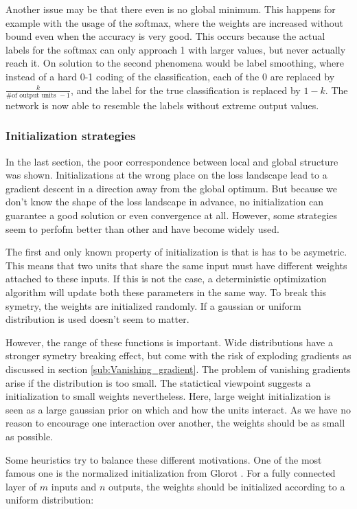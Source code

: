 Another issue may be that there even is no global minimum. This happens for
example with the usage of the softmax, where the weights are increased without
bound even when the accuracy is very good. This occurs because the actual labels
for the softmax can only approach 1 with larger values, but never actually reach
it.  On solution to the second phenomena would be label smoothing, where instead
of a hard 0-1 coding of the classification, each of the 0 are replaced by
$\frac{k}{\textrm{\# of output units }-1}$, and the label for the true
classification is replaced by $1-k$. The network is now able to
resemble the labels without extreme output values.


\subsubsection{Initialization strategies}\label{sub:Initialization_strategies}
In the last section, the poor correspondence between local and global structure
was shown. Initializations at the wrong place on the loss landscape lead to a
gradient descent in a direction away from the global optimum. But because we
don't know the shape of the loss landscape in advance, no initialization can
guarantee a good solution or even convergence at all. However, some strategies
seem to perfofm better than other and have become widely used.

The first and only known property of initialization is that is has to be
asymetric. This means that two units that share the same input must have
different weights attached to these inputs. If this is not the case, a
deterministic optimization algorithm will update both these parameters in the
same way. To break this symetry, the weights are initialized randomly. If a
gaussian or uniform distribution is used doesn't seem to matter.

However, the range of these functions is important. Wide distributions have a
stronger symetry breaking effect, but come with the risk of exploding gradients
as discussed in section \ref{sub:Vanishing_gradient}. The problem of vanishing
gradients arise if the distribution is too small. The statictical viewpoint
suggests a initialization to small weights nevertheless. Here, large weight
initialization is seen as a large gaussian prior on which and how the units
interact. As we have no reason to encourage one interaction over another, the
weights should be as small as possible. 

Some heuristics try to balance these different motivations. One of the most
famous one is the normalized initialization from Glorot
\cite{glorot2010understanding}. For a fully connected layer of $m$ inputs and
$n$ outputs, the weights should be initialized according to a uniform
distribution:

